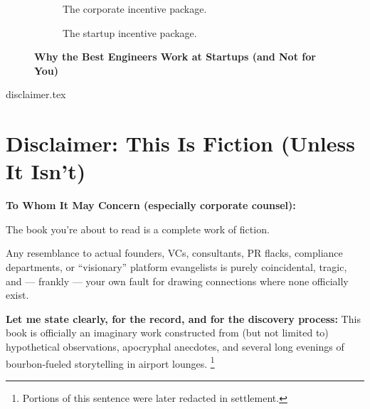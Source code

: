 \documentclass{article}
\begin{document}
\begin{titlepage}
\begin{figure}[H]
      \begin{subfigure}[t]{0.45\textwidth}
      \centering
      \caption*{The corporate incentive package.}
      \end{subfigure}
      \hfill
      \begin{subfigure}[t]{0.45\textwidth}
      \centering
      \caption*{The startup incentive package.}
      \end{subfigure}
      
      \caption*{\textbf{Why the Best Engineers Work at Startups (and Not for You)}}
    \end{figure}
      
  
  \end{titlepage}

  {disclaimer.tex}



  \section*{Disclaimer: This Is Fiction (Unless It Isn't)}
  
  \bigskip
  
  \textbf{To Whom It May Concern (especially corporate counsel):}
  
  The book you’re about to read is a complete work of fiction.
  
  Any resemblance to actual founders, VCs, consultants, PR flacks, compliance departments, or 
  ``visionary'' platform evangelists is purely coincidental, tragic, and --- frankly --- your own fault 
  for drawing connections where none officially exist.
  
  \textbf{Let me state clearly, for the record, and for the discovery process:}
  This book is officially an imaginary work 
  constructed from (but not limited to) hypothetical observations, apocryphal anecdotes, and several long evenings of 
  bourbon-fueled storytelling in airport lounges.
  \footnote{Portions of this sentence were later redacted in settlement.}
\end{document}

